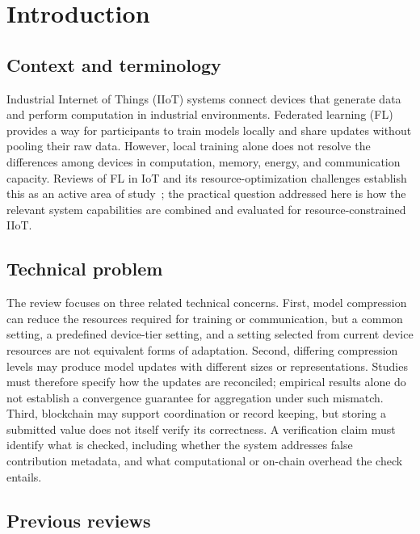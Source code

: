 \documentclass[journal]{IEEEtran}
\begin{document}
\section{Introduction}
\label{sec:introduction}

\subsection{Context and terminology}

Industrial Internet of Things (IIoT) systems connect devices that generate data and perform computation in industrial environments. Federated learning (FL) provides a way for participants to train models locally and share updates without pooling their raw data. However, local training alone does not resolve the differences among devices in computation, memory, energy, and communication capacity. Reviews of FL in IoT and its resource-optimization challenges establish this as an active area of study~\cite{hosseinzadeh2022iot,ferreira2023resource}; the practical question addressed here is how the relevant system capabilities are combined and evaluated for resource-constrained IIoT.

\subsection{Technical problem}

The review focuses on three related technical concerns. First, model compression can reduce the resources required for training or communication, but a common setting, a predefined device-tier setting, and a setting selected from current device resources are not equivalent forms of adaptation. Second, differing compression levels may produce model updates with different sizes or representations. Studies must therefore specify how the updates are reconciled; empirical results alone do not establish a convergence guarantee for aggregation under such mismatch. Third, blockchain may support coordination or record keeping, but storing a submitted value does not itself verify its correctness. A verification claim must identify what is checked, including whether the system addresses false contribution metadata, and what computational or on-chain overhead the check entails.

\subsection{Previous reviews}
\end{document}
